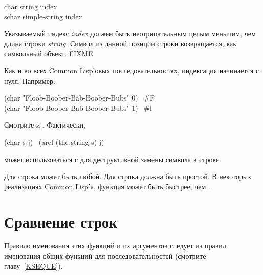 \begin{defun}[Функция]
char string index \\
schar simple-string index

Указываемый индекс \emph{index} должен быть неотрицательным целым меньшим, чем длина
строки \emph{string}. Символ из данной позиции строки возвращается, как символьный
объект. FIXME

Как и во всех Common Lisp'овых последовательностях, индексация начинается с
нуля.
Например:
\begin{lisp}
(char "Floob-Boober-Bab-Boober-Bubs" 0) \EV\ \#{\Xbackslash}F \\
(char "Floob-Boober-Bab-Boober-Bubs" 1) \EV\ \#{\Xbackslash}l
\end{lisp}
Смотрите  и . Фактически, 
\begin{lisp}
(char s j) \EQ\ (aref (the string s) j)
\end{lisp}
 может использоваться с  для деструктивной замены символа в
строке.

Для  строка может быть любой.
Для  строка должна быть простой.
В некоторых реализациях Common Lisp'а, функция  может быть быстрее,
чем .
\end{defun}

\section{Сравнение строк}

Правило именования этих функций и их аргументов следует из правил именования
общих функций для последовательностей (смотрите главу~\ref{KSEQUE}).

